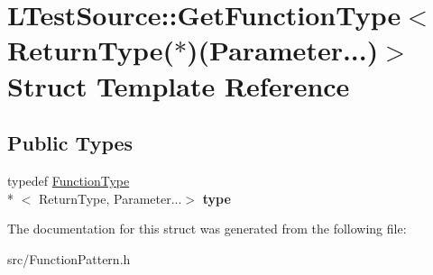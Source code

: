 \hypertarget{struct_l_test_source_1_1_get_function_type_3_01_return_type_07_5_08_07_parameter_8_8_8_08_4}{\section{L\-Test\-Source\-:\-:Get\-Function\-Type$<$ Return\-Type($\ast$)(Parameter...)$>$ Struct Template Reference}
\label{struct_l_test_source_1_1_get_function_type_3_01_return_type_07_5_08_07_parameter_8_8_8_08_4}
}
\subsection*{Public Types}
\begin{DoxyCompactItemize}
\item 
\hypertarget{struct_l_test_source_1_1_get_function_type_3_01_return_type_07_5_08_07_parameter_8_8_8_08_4_af2c35609c307e43a51bf0ce027978e35}{typedef \hyperlink{struct_l_test_source_1_1_function_type}{Function\-Type}\\*
$<$ Return\-Type, Parameter...$>$ {\bfseries type}}\label{struct_l_test_source_1_1_get_function_type_3_01_return_type_07_5_08_07_parameter_8_8_8_08_4_af2c35609c307e43a51bf0ce027978e35}

\end{DoxyCompactItemize}


The documentation for this struct was generated from the following file\-:\begin{DoxyCompactItemize}
\item 
src/Function\-Pattern.\-h\end{DoxyCompactItemize}
